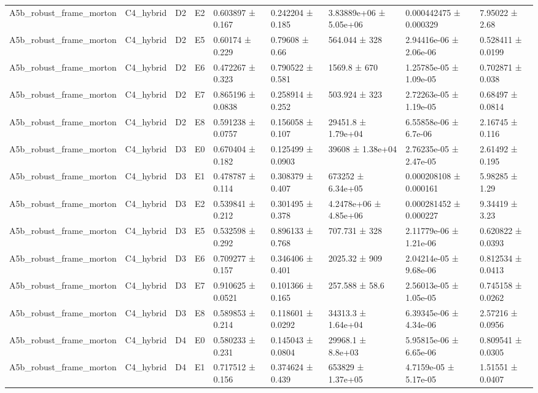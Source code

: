 \begin{table}
\begin{tabular}{lllllllll}
A5b\_robust\_frame\_morton & C4\_hybrid & D2 & E2 & 0.603897 ± 0.167 & 0.242204 ± 0.185 & 3.83889e+06 ± 5.05e+06 & 0.000442475 ± 0.000329 & 7.95022 ± 2.68 \\
A5b\_robust\_frame\_morton & C4\_hybrid & D2 & E5 & 0.60174 ± 0.229 & 0.79608 ± 0.66 & 564.044 ± 328 & 2.94416e-06 ± 2.06e-06 & 0.528411 ± 0.0199 \\
A5b\_robust\_frame\_morton & C4\_hybrid & D2 & E6 & 0.472267 ± 0.323 & 0.790522 ± 0.581 & 1569.8 ± 670 & 1.25785e-05 ± 1.09e-05 & 0.702871 ± 0.038 \\
A5b\_robust\_frame\_morton & C4\_hybrid & D2 & E7 & 0.865196 ± 0.0838 & 0.258914 ± 0.252 & 503.924 ± 323 & 2.72263e-05 ± 1.19e-05 & 0.68497 ± 0.0814 \\
A5b\_robust\_frame\_morton & C4\_hybrid & D2 & E8 & 0.591238 ± 0.0757 & 0.156058 ± 0.107 & 29451.8 ± 1.79e+04 & 6.55858e-06 ± 6.7e-06 & 2.16745 ± 0.116 \\
A5b\_robust\_frame\_morton & C4\_hybrid & D3 & E0 & 0.670404 ± 0.182 & 0.125499 ± 0.0903 & 39608 ± 1.38e+04 & 2.76235e-05 ± 2.47e-05 & 2.61492 ± 0.195 \\
A5b\_robust\_frame\_morton & C4\_hybrid & D3 & E1 & 0.478787 ± 0.114 & 0.308379 ± 0.407 & 673252 ± 6.34e+05 & 0.000208108 ± 0.000161 & 5.98285 ± 1.29 \\
A5b\_robust\_frame\_morton & C4\_hybrid & D3 & E2 & 0.539841 ± 0.212 & 0.301495 ± 0.378 & 4.2478e+06 ± 4.85e+06 & 0.000281452 ± 0.000227 & 9.34419 ± 3.23 \\
A5b\_robust\_frame\_morton & C4\_hybrid & D3 & E5 & 0.532598 ± 0.292 & 0.896133 ± 0.768 & 707.731 ± 328 & 2.11779e-06 ± 1.21e-06 & 0.620822 ± 0.0393 \\
A5b\_robust\_frame\_morton & C4\_hybrid & D3 & E6 & 0.709277 ± 0.157 & 0.346406 ± 0.401 & 2025.32 ± 909 & 2.04214e-05 ± 9.68e-06 & 0.812534 ± 0.0413 \\
A5b\_robust\_frame\_morton & C4\_hybrid & D3 & E7 & 0.910625 ± 0.0521 & 0.101366 ± 0.165 & 257.588 ± 58.6 & 2.56013e-05 ± 1.05e-05 & 0.745158 ± 0.0262 \\
A5b\_robust\_frame\_morton & C4\_hybrid & D3 & E8 & 0.589853 ± 0.214 & 0.118601 ± 0.0292 & 34313.3 ± 1.64e+04 & 6.39345e-06 ± 4.34e-06 & 2.57216 ± 0.0956 \\
A5b\_robust\_frame\_morton & C4\_hybrid & D4 & E0 & 0.580233 ± 0.231 & 0.145043 ± 0.0804 & 29968.1 ± 8.8e+03 & 5.95815e-06 ± 6.65e-06 & 0.809541 ± 0.0305 \\
A5b\_robust\_frame\_morton & C4\_hybrid & D4 & E1 & 0.717512 ± 0.156 & 0.374624 ± 0.439 & 653829 ± 1.37e+05 & 4.7159e-05 ± 5.17e-05 & 1.51551 ± 0.0407 \\

\end{tabular}
\end{table}
